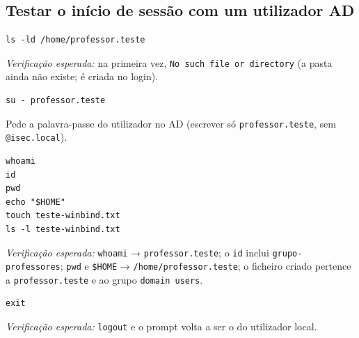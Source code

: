 
\subsection[Testar o início de sessão com um utilizador AD]{Testar o início de sessão com um utilizador AD}


\begin{lstlisting}[style=bashstyle]
ls -ld /home/professor.teste
\end{lstlisting}

\emph{Verificação esperada:} na primeira vez, \texttt{No such file or directory} (a pasta ainda não existe; é criada no login).


\begin{lstlisting}[style=bashstyle]
su - professor.teste
\end{lstlisting}

Pede a palavra-passe do utilizador no AD (escrever só \texttt{professor.teste}, sem \texttt{@isec.local}).


\begin{lstlisting}[style=bashstyle]
whoami
id
pwd
echo "$HOME"
touch teste-winbind.txt
ls -l teste-winbind.txt
\end{lstlisting}

\emph{Verificação esperada:} \texttt{whoami} → \texttt{professor.teste}; o \texttt{id} inclui \texttt{grupo-professores}; \texttt{pwd} e \texttt{\$HOME} → \texttt{/\allowbreak{}home/\allowbreak{}professor.teste}; o ficheiro criado pertence a \texttt{professor.teste} e ao grupo \texttt{domain users}.


\begin{lstlisting}[style=bashstyle]
exit
\end{lstlisting}

\emph{Verificação esperada:} \texttt{logout} e o prompt volta a ser o do utilizador local.

